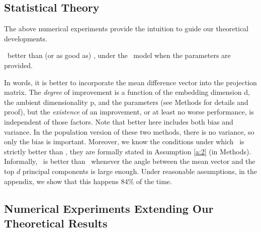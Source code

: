 \documentclass[10pt]{article}
\begin{document}
\subsection*{Statistical Theory}

The above numerical experiments provide the intuition to guide our theoretical developments.
\begin{thm} \label{t:LDA}
\Lol~better than (or as good as) \Pca, under the \Lda~model when the parameters are provided.  
\end{thm}
In words, it is better to incorporate the mean difference vector into the projection matrix.  The \emph{degree} of improvement is a function of the embedding dimension d, the ambient dimensionality p, and the parameters (see Methods for details and proof), but the \emph{existence} of an improvement, or at least no worse performance, is independent of those factors.  Note that better here includes both bias and variance.  In the population version of these two methods, there is no variance, so only the bias is important.  Moreover, we know the conditions under which \Lol~is strictly better than \Pca, they are formally stated in Assumption \ref{a:2} (in Methods).  Informally, \Lol~is better than \Pca~whenever the angle between the mean vector and the top $d$ principal components is large enough. Under reasonable assumptions, in the appendix, we show that this happens $84\%$ of the time.  



\subsection*{Numerical Experiments Extending Our Theoretical Results}

\end{document}
